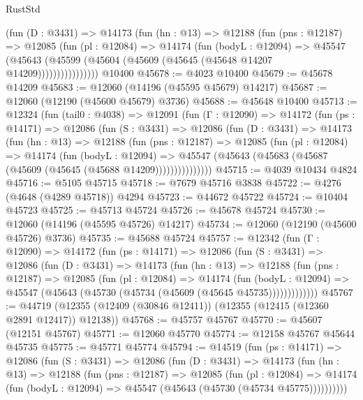 \begin{lexlean}{RustStd}
\begin{coremodule}
              (fun (D : @3431) =>
              @14173
                (fun (hn : @13) =>
                @12188
                  (fun (pns : @12187) =>
                  @12085
                    (fun (pl : @12084) =>
                    @14174
                      (fun (bodyL : @12094) =>
                      @45547
                        (@45643
                          (@45599 (@45604 (@45609 (@45645 (@45648 @14207 @14209))))))))))))))))
    @10400
@45678 := @4023 @10400
@45679 := @45678 @14209
@45683 := @12060 (@14196 (@45595 @45679) @14217)
@45687 := @12060 (@12190 (@45600 @45679) @3736)
@45688 := @45648 @10400
@45713 := @12324
    (fun (tail0 : @4038) =>
    @12091
      (fun (Γ : @12090) =>
      @14172
        (fun (ps : @14171) =>
        @12086
          (fun (S : @3431) =>
          @12086
            (fun (D : @3431) =>
            @14173
              (fun (hn : @13) =>
              @12188
                (fun (pns : @12187) =>
                @12085
                  (fun (pl : @12084) =>
                  @14174
                    (fun (bodyL : @12094) =>
                    @45547 (@45643 (@45683 (@45687 (@45609 (@45645 (@45688 @14209)))))))))))))))
@45715 := @4039 @10434 @4824
@45716 := @5105 @45715
@45718 := @7679 @45716 @3838
@45722 := @4276 (@4648 (@4289 @45718)) @4294
@45723 := @44672 @45722
@45724 := @10404 @45723
@45725 := @45713 @45724
@45726 := @45678 @45724
@45730 := @12060 (@14196 (@45595 @45726) @14217)
@45734 := @12060 (@12190 (@45600 @45726) @3736)
@45735 := @45688 @45724
@45757 := @12342
    (fun (Γ : @12090) =>
    @14172
      (fun (ps : @14171) =>
      @12086
        (fun (S : @3431) =>
        @12086
          (fun (D : @3431) =>
          @14173
            (fun (hn : @13) =>
            @12188
              (fun (pns : @12187) =>
              @12085
                (fun (pl : @12084) =>
                @14174
                  (fun (bodyL : @12094) =>
                  @45547 (@45643 (@45730 (@45734 (@45609 (@45645 @45735)))))))))))))
@45767 := @44719 (@12355 (@12409 (@30846 @12411)) (@12355 (@12415 (@12360 @2891 @12417)) @12138))
@45768 := @45757 @45767
@45770 := @45607 (@12151 @45767)
@45771 := @12060 @45770
@45774 := @12158 @45767 @45644 @45735
@45775 := @45771 @45774
@45794 := @14519
    (fun (ps : @14171) =>
    @12086
      (fun (S : @3431) =>
      @12086
        (fun (D : @3431) =>
        @14173
          (fun (hn : @13) =>
          @12188
            (fun (pns : @12187) =>
            @12085
              (fun (pl : @12084) =>
              @14174 (fun (bodyL : @12094) => @45547 (@45643 (@45730 (@45734 @45775))))))))))

\end{coremodule}
\end{lexlean}
